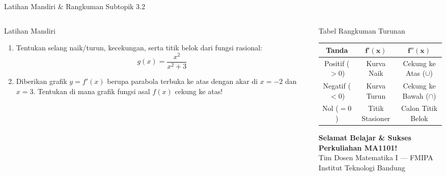 \documentclass[aspectratio=169,10pt]{beamer}
\begin{document}
\begin{frame}{Latihan Mandiri \& Rangkuman Subtopik 3.2}
    \begin{columns}[T]
        \begin{column}{0.48\textwidth}
            \begin{block}{Latihan Mandiri}
                \begin{enumerate}
                    \item Tentukan selang naik/turun, kecekungan, serta titik belok dari fungsi rasional:
                    \[
                        g(x) = \frac{x^2}{x^2 + 3}
                    \]
                    \item Diberikan grafik $y = f'(x)$ berupa parabola terbuka ke atas dengan akar di $x = -2$ dan $x = 3$. Tentukan di mana grafik fungsi asal $f(x)$ cekung ke atas!
                \end{enumerate}
            \end{block}
        \end{column}

        \begin{column}{0.48\textwidth}
            \begin{exampleblock}{Tabel Rangkuman Turunan}
                \centering
                \small
                \setlength{\tabcolsep}{3pt}
                \begin{tabular}{|c|c|c|}
                    \hline
                    \textbf{Tanda} & $\mathbf{f'(x)}$ & $\mathbf{f''(x)}$ \\
                    \hline
                    Positif ($>0$) & Kurva Naik & Cekung ke Atas ($\cup$) \\
                    Negatif ($<0$) & Kurva Turun & Cekung ke Bawah ($\cap$) \\
                    Nol ($=0$) & Titik Stasioner & Calon Titik Belok \\
                    \hline
                \end{tabular}
            \end{exampleblock}

            \vspace{0.15cm}
            \centering
            {\small \textbf{Selamat Belajar \& Sukses Perkuliahan MA1101!}}\\
            {\scriptsize \color{SoftGray} Tim Dosen Matematika I --- FMIPA Institut Teknologi Bandung}
        \end{column}
    \end{columns}
\end{frame}
\end{document}
